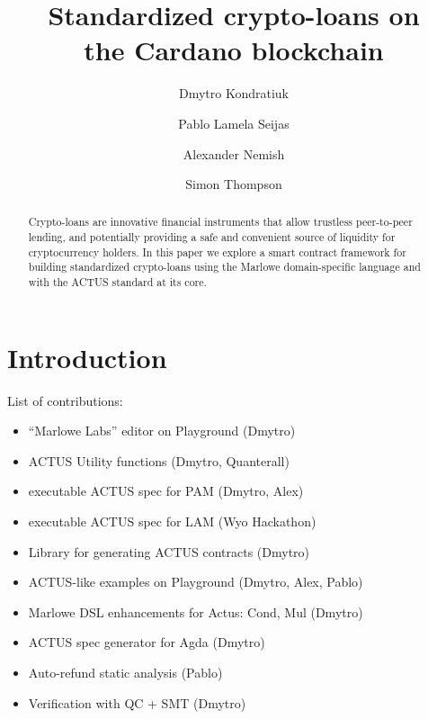 \documentclass[runningheads]{llncs}
\begin{document}
\title{Standardized crypto-loans on\\ the Cardano blockchain}%


\author{Dmytro Kondratiuk \and
				Pablo {Lamela Seijas} \and
				Alexander Nemish \and
                Simon Thompson}





%
\maketitle              %
%
\begin{abstract}
Crypto-loans are %
innovative financial instruments that
allow trustless peer-to-peer %
lending, and potentially providing a safe and convenient
source of liquidity for cryptocurrency holders. In this paper we
explore a smart contract framework for building standardized crypto-loans
using the Marlowe domain-specific language and with the ACTUS standard at its core.

\end{abstract}


\section{Introduction}



\bigskip\noindent
List of contributions:
\begin{itemize}
\item \textquotedblleft Marlowe Labs\textquotedblright{} editor on Playground
(Dmytro) 
\item ACTUS Utility functions (Dmytro, Quanterall) 
\item executable ACTUS spec for PAM (Dmytro, Alex) 
\item executable ACTUS spec for LAM (Wyo Hackathon) 
\item Library for generating ACTUS contracts (Dmytro) 
\item ACTUS-like examples on Playground (Dmytro, Alex, Pablo) 
\item Marlowe DSL enhancements for Actus: Cond, Mul (Dmytro)
\item ACTUS spec generator for Agda (Dmytro) 
\item Auto-refund static analysis (Pablo)
\item Verification with QC + SMT (Dmytro) 
\end{itemize}
\end{document}
